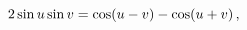 \[2\mathop{\sin\/}\nolimits u\mathop{\sin\/}\nolimits v=\mathop{\cos\/}\nolimits%
\!\left(u-v\right)-\mathop{\cos\/}\nolimits\!\left(u+v\right),\]